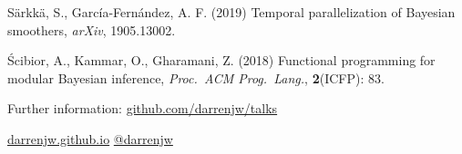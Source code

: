 \documentclass[mathserif,handout]{beamer}
\begin{document}
\begin{frame}
\begin{thebibliography}{}
\bibitem{} Särkkä, S., García-Fernández, A. F. (2019) \alert{Temporal parallelization of Bayesian smoothers}, \emph{arXiv}, 1905.13002.
  

\bibitem{} \'{S}cibior, A., Kammar, O., Gharamani, Z. (2018) \alert{Functional programming for modular Bayesian inference}, \emph{Proc.\ ACM Prog.\ Lang.}, \textbf{2}(ICFP): 83.
      
    
    
%
    
  \end{thebibliography}

  \vspace*{0.8ex}

Further information: \alert{\url{github.com/darrenjw/talks}}
  


\alert{\url{darrenjw.github.io}} \hfill \url{@darrenjw}
  
\end{frame}
\end{document}
